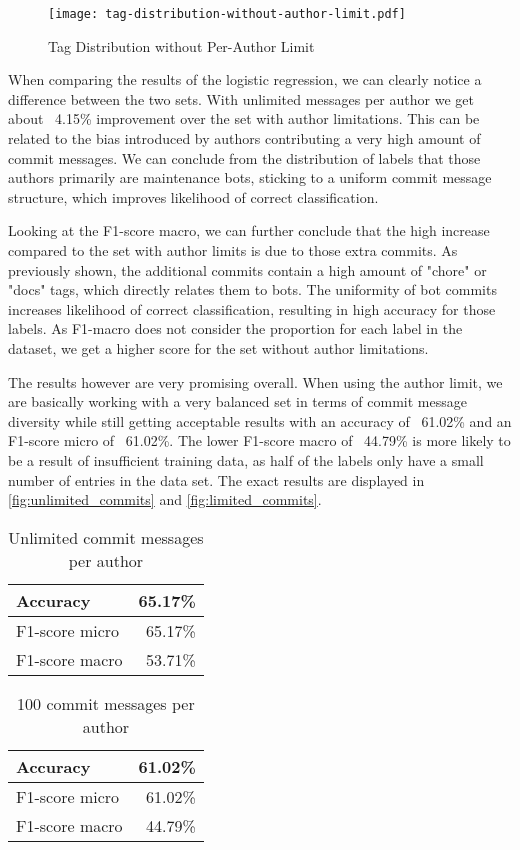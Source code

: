 \begin{figure}[H]
  \centering
  \texttt{[image: tag-distribution-without-author-limit.pdf]}
  \caption{Tag Distribution without Per-Author Limit}
  \label{fig:tag_dist_without_limit}
\end{figure}

When comparing the results of the logistic regression, we can clearly notice a difference between the two sets.
With unlimited messages per author we get about ~4.15\% improvement over the set with author limitations. This
can be related to the bias introduced by authors contributing a very high amount of commit messages. We can
conclude from the distribution of labels that those authors primarily are maintenance bots, sticking to a
uniform commit message structure, which improves likelihood of correct classification.

Looking at the F1-score macro, we can further conclude that the high increase compared to the set with author
limits is due to those extra commits. As previously shown, the additional commits contain a high amount of
"chore" or "docs" tags, which directly relates them to bots. The uniformity of bot commits increases likelihood
of correct classification, resulting in high accuracy for those labels. As F1-macro does not consider the
proportion for each label in the dataset, we get a higher score for the set without author limitations.

The results however are very promising overall. When using the author limit, we are basically working with a
very balanced set in terms of commit message diversity while still getting acceptable results with an accuracy
of ~61.02\% and an F1-score micro of ~61.02\%. The lower F1-score macro of ~44.79\% is more likely to be a
result of insufficient training data, as half of the labels only have a small number of entries in the data set.
The exact results are displayed in \autoref{fig:unlimited_commits} and \autoref{fig:limited_commits}.

\begin{table}[H]
  \def\arraystretch{1.15}%
  \centering
  \begin{tabular}{|l|r|}
    \hline
    Accuracy       & 65.17\% \\
    \hline
    F1-score micro & 65.17\% \\
    \hline
    F1-score macro & 53.71\% \\
    \hline
  \end{tabular}
  \caption{Unlimited commit messages per author}
  \label{fig:unlimited_commits}
\end{table}

\begin{table}[H]
  \def\arraystretch{1.15}%
  \centering
  \begin{tabular}{|l|r|}
    \hline
    Accuracy       & 61.02\% \\
    \hline
    F1-score micro & 61.02\% \\
    \hline
    F1-score macro & 44.79\% \\
    \hline
  \end{tabular}
  \caption{100 commit messages per author}
  \label{fig:limited_commits}
\end{table}


